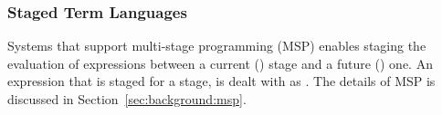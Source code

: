 \subsubsection{Staged Term Languages}
\label{sec:generation:staged}
Systems that support multi-stage programming (MSP) enables staging the evaluation of expressions between a current () stage and a future () one. An expression that is staged for a  stage, is dealt with as . The details of MSP is discussed in Section~\ref{sec:background:msp}. 
\begin{comment}
Our framework provides some prelude definitions that are used to define the staged term language. First, we define two stages; The code of an expression that lives in stage \lstmath{s0} belong to stage \lstmath{s1}.   
\begin{togcode}
data Stage  : Set where
  s0 : Stage 
  s1 : Stage  
\end{togcode}
switching between stages is done via the \lstmath{code} and \lstmath{uncode} functions. 
\begin{togcode}
code : {A  : Set }  ~$\to$~ CodeRep A s0 ~$\to$~ CodeRep A s1 
code x  = (Q x )    
uncode : {A  : Set }  ~$\to$~ CodeRep A s1 ~$\to$~ CodeRep A s0
uncode (Q x )  = x 
\end{togcode}
where \lstmath{CodeRep} is a type for switching between levels 
\begin{togcode}
data Wrap (A  : Set )  : Set where
  Q : (A  ~$\to$~ (Wrap A ))     
CodeRep : (A  : Set) (s : Stage) ~$\to$~ Set
CodeRep A s0  = A 
CodeRep A s1  = (Wrap (CodeRep A s0 ) )
\end{togcode}
The evaluation of a quoted expression is done via the \lstmath{run} function 
\begin{togcode}
run : {A  : Set }  ~$\to$~ CodeRep A s1  ~$\to$~ A
run (Q x)  = x 
\end{togcode}
Now we can define the \lstmath{Staged} type 
\begin{togcode}
data Staged (A  : Set )  : Set where
  Now : A ~$\to$~ Staged A
  Later : Comp A s1 ~$\to$~ Staged A 
\end{togcode}
\end{comment}

